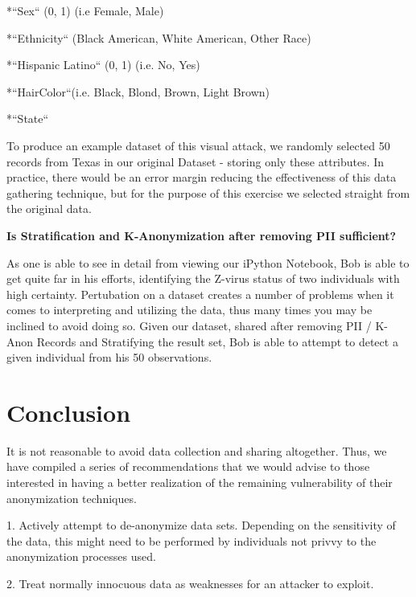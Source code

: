 \documentclass[10pt,journal,compsoc]{IEEEtran}
\begin{document}
		*``Sex`` (0, 1) (i.e Female, Male)
		
		*``Ethnicity`` (Black American, White American, Other Race)
		
		*``Hispanic Latino`` (0, 1) (i.e. No, Yes)
		
		*``HairColor``(i.e. Black, Blond, Brown, Light Brown)
		
		*``State``
		
To produce an example dataset of this visual attack, we randomly selected 50 records from Texas in our original Dataset - storing only these attributes. In practice, there would be an error margin reducing the effectiveness of this data gathering technique, but for the purpose of this exercise we selected straight from the original data.   \linebreak


\noindent \textbf {Is Stratification and K-Anonymization after removing PII sufficient?}

As one is able to see in detail from viewing our iPython Notebook, Bob is able to get quite far in his efforts, identifying the Z-virus status of two individuals with high certainty.  Pertubation on a dataset creates a number of problems when it comes to interpreting and utilizing the data, thus many times you may be inclined to avoid doing so. Given our dataset, shared after removing PII / K-Anon Records and Stratifying the result set, Bob is able to attempt to detect a given individual from his 50 observations.

	

\section{Conclusion}

	It is not reasonable to avoid data collection and sharing altogether.  Thus, we have compiled a series of recommendations that we would advise to those interested in having a better realization of the remaining vulnerability of their anonymization techniques.\linebreak
	
1. Actively attempt to de-anonymize data sets.  Depending on the sensitivity of the data, this might need to be performed by individuals not privvy to the anonymization processes used.\linebreak

2.  Treat normally innocuous data as weaknesses for an attacker to exploit. \linebreak
\end{document}
